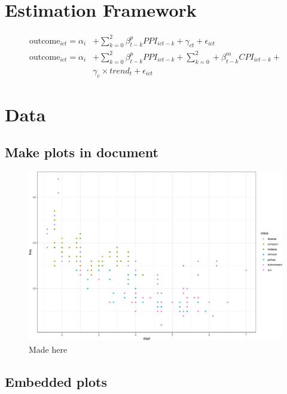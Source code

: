 \documentclass[12pt,]{article}
\begin{document}
\section{Estimation Framework}\label{estimation-framework}

\begin{align*}
\text{outcome}_{ict} = \alpha_i & + \sum_{k=0}^2 \beta_{t-k}^p
PPI_{ict-k} + \gamma_{ct} + \epsilon_{ict} \\
\text{outcome}_{ict} = \alpha_i & + \sum_{k=0}^2 \beta_{t-k}^p PPI_{ict-k} +
\sum_{k=0}^2 + \beta_{t-k}^m CPI_{ict-k} + \\ & \gamma_{c}\times
trend_t + \epsilon_{ict}
\end{align*}

\section{Data}\label{data}

\subsection{Make plots in document}\label{make-plots-in-document}

\begin{figure}
\centering
\includegraphics{Figs/unnamed-chunk-2-1.pdf}
\caption{Made here}
\end{figure}

\newpage

\subsection{Embedded plots}\label{embedded-plots}
\end{document}
